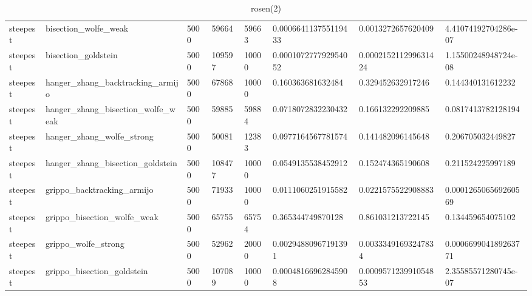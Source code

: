 \documentclass[a4paper,11pt]{article}
\numberwithin{equation}{section} %
\begin{document}
\begin{table}[h!]
{\begin{tabular}{|l|l|l|l|l|l|l|l|}
        steepest & bisection\_wolfe\_weak & 5000 & 59664 & 59663 & 0.000664113755119433 & 0.0013272657620409 & 4.41074192704286e-07 \\
        steepest & bisection\_goldstein & 5000 & 109597 & 10000 & 0.000107277792954052 & 0.000215211299631424 & 1.15500248948724e-08 \\
        steepest & hanger\_zhang\_backtracking\_armijo & 5000 & 67868 & 10000 & 0.160363681632484 & 0.329452632917246 & 0.144340131612232 \\
        steepest & hanger\_zhang\_bisection\_wolfe\_weak & 5000 & 59885 & 59884 & 0.0718072832230432 & 0.166132292209885 & 0.0817413782128194 \\
        steepest & hanger\_zhang\_wolfe\_strong & 5000 & 50081 & 12383 & 0.0977164567781574 & 0.141482096145648 & 0.206705032449827 \\
        steepest & hanger\_zhang\_bisection\_goldstein & 5000 & 108477 & 10000 & 0.0549135538452912 & 0.152474365190608 & 0.211524225997189 \\
        steepest & grippo\_backtracking\_armijo & 5000 & 71933 & 10000 & 0.0111060251915582 & 0.0221575522908883 & 0.000126506569260569 \\
        steepest & grippo\_bisection\_wolfe\_weak & 5000 & 65755 & 65754 & 0.365344749870128 & 0.861031213722145 & 0.134459654075102 \\
        steepest & grippo\_wolfe\_strong & 5000 & 52962 & 20000 & 0.00294880967191391 & 0.00333491693247834 & 0.000669904189263771 \\
        steepest & grippo\_bisection\_goldstein & 5000 & 107089 & 10000 & 0.00048166962845908 & 0.000957123991054853 & 2.35585571280745e-07 \\
\end{tabular}}
\caption{rosen(2)}
\label{table:rosen(2)}
\end{table}
\end{document}

